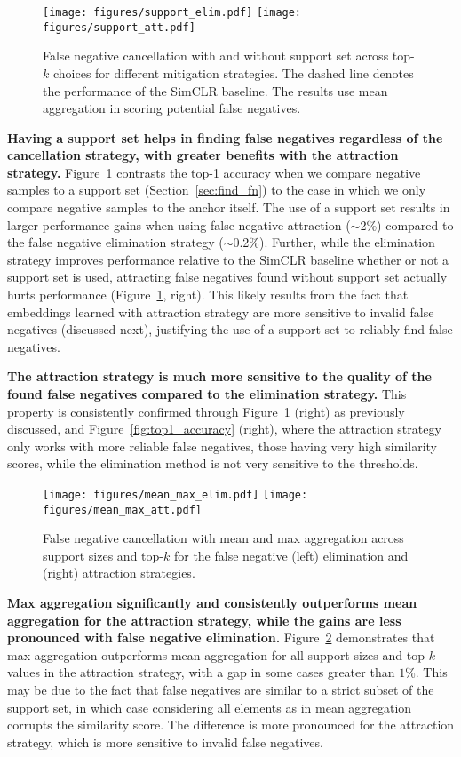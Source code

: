 \documentclass[10pt,twocolumn,letterpaper]{article}
\begin{document}
\begin{figure}[!b]
\texttt{[image: figures/support\_elim.pdf]} \hfil
\texttt{[image: figures/support\_att.pdf]}
\caption{False negative cancellation with and without support set across top-$k$ choices for different mitigation strategies. The dashed line denotes the performance of the SimCLR baseline. The results use mean aggregation in scoring potential false negatives.}
    \label{fig:support_topk}
\end{figure}
\textbf{Having a support set helps in finding false negatives regardless of the cancellation strategy, with greater benefits with the attraction strategy.} Figure~\ref{fig:support_topk} contrasts the top-1 accuracy when we compare negative samples to a support set (Section~\ref{sec:find_fn}) to the case in which we only compare negative samples to the anchor itself. The use of a support set results in larger performance gains when using false negative attraction ($\sim$2\%) compared to the false negative elimination strategy ($\sim$0.2\%). Further, while the elimination strategy improves performance relative to the SimCLR baseline whether or not a support set is used, attracting false negatives found without support set actually hurts performance (Figure~\ref{fig:support_topk}, right). This likely results from the fact that embeddings learned with attraction strategy are more sensitive to invalid false negatives (discussed next), justifying the use of a support set to reliably find false negatives.

\textbf{The attraction strategy is much more sensitive to the quality of the found false negatives compared to the elimination strategy.} This property is consistently confirmed through Figure~\ref{fig:support_topk} (right) as previously discussed, and Figure~\ref{fig:top1_accuracy} (right), where the attraction strategy only works with more reliable false negatives, those having very high similarity scores, while the elimination method is not very sensitive to the thresholds.

\begin{figure}[!t]
\texttt{[image: figures/mean\_max\_elim.pdf]} \hfil
\texttt{[image: figures/mean\_max\_att.pdf]}
\caption{False negative cancellation with mean and max aggregation across support sizes and top-$k$ for the false negative (left) elimination and (right) attraction strategies.} \label{fig:mean_max}
    \vspace{-5pt}
\end{figure}
\textbf{Max aggregation significantly and consistently outperforms mean aggregation for the attraction strategy, while the gains are less pronounced with false negative elimination.} Figure~\ref{fig:mean_max} demonstrates that max aggregation outperforms mean aggregation for all support sizes and top-$k$ values in the attraction strategy, with a gap in some cases greater than $1\%$. This may be due to the fact that false negatives are similar to a strict subset of the support set, in which case considering all elements as in mean aggregation corrupts the similarity score. The difference is more pronounced for the attraction strategy, which is more sensitive to invalid false negatives.
\end{document}
